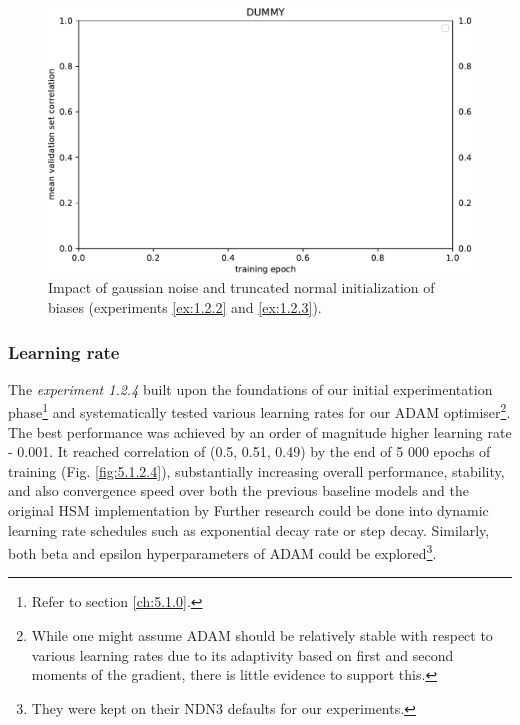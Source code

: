 \begin{figure}[H]
    \centering
    \includegraphics[width=1\textwidth]{../figures/05_dummy}
    \caption[Experiments 1.2.2 and 1.2.3]{Impact of gaussian noise and truncated normal initialization of biases (experiments \ref{ex:1.2.2} and \ref{ex:1.2.3}).}
    \label{fig:5.1.2.2}
\end{figure}

\subsubsection{Learning rate}\label{ex:1.2.4}

The \emph{experiment 1.2.4} built upon the foundations of our initial experimentation phase\footnote{Refer to section \ref{ch:5.1.0}.} and systematically tested various learning rates for our ADAM optimiser\footnote{While one might assume ADAM should be relatively stable with respect to various learning rates due to its adaptivity based on first and second moments of the gradient, there is little evidence to support this.}. The best performance was achieved by an order of magnitude higher learning rate - 0.001. It reached correlation of (0.5, 0.51, 0.49) by the end of 5 000 epochs of training (Fig. \ref{fig:5.1.2.4}), substantially increasing overall performance, stability, and also convergence speed over both the previous baseline models and the original HSM implementation by \citeauthor{antolik} Further research could be done into dynamic learning rate schedules such as exponential decay rate or step decay. Similarly, both beta and epsilon hyperparameters of ADAM could be explored\footnote{They were kept on their NDN3 defaults for our experiments.}.


